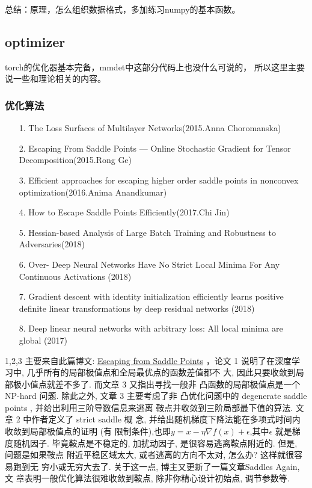 \documentclass[UTF8]{ctexart}
\begin{document}
总结：原理，怎么组织数据格式，多加练习numpy的基本函数。

\subsection{optimizer}
torch的优化器基本完备，mmdet中这部分代码上也没什么可说的，
所以这里主要说一些和理论相关的内容。

\subsubsection{优化算法}

\begin{itemize}
	\item[1.] The Loss Surfaces of Multilayer Networks(2015.Anna Choromanska) \label{all not diff}
	\item[2.]  Escaping From Saddle Points — Online Stochastic Gradient for Tensor
	Decomposition(2015.Rong Ge)
	\item[3.] Efficient approaches for escaping higher order saddle points in 
	nonconvex optimization(2016.Anima Anandkumar)
	\item[4.]  How to Escape Saddle Points Efficiently(2017.Chi Jin)
	\item[5.]  Hessian-based Analysis of Large Batch Training and Robustness to
	Adversaries(2018)
	\item[6.] Over- Deep Neural Networks Have No Strict Local Minima For Any
	Continuous Activations (2018)
	\item[7.] Gradient descent with identity initialization efficiently learns positive
	definite linear transformations by deep residual networks (2018)
	\item[8.] Deep linear neural networks with arbitrary loss: All local minima are
	global (2017)
	
\end{itemize}

1,2,3 主要来自此篇博文:
\href{http://www.offconvex.org/2016/03/22/saddlepoints/}{Escaping from Saddle Points}
，论文 1 说明了在深度学习中, 几乎所有的局部极值点和全局最优点的函数差值都不
大, 因此只要收敛到局部极小值点就差不多了. 而文章 3 又指出寻找一般非
凸函数的局部极值点是一个 NP-hard 问题. 除此之外, 文章 3 主要考虑了非
凸优化问题中的 degenerate saddle points , 并给出利用三阶导数信息来逃离
鞍点并收敛到三阶局部最下值的算法. 文章 2 中作者定义了 strict saddle 概
念, 并给出随机梯度下降法能在多项式时间内收敛到局部极值点的证明 (有
限制条件),也即$y=x-\eta \nabla f(x)+\epsilon$,其中$\epsilon$ 就是梯度随机因子.
毕竟鞍点是不稳定的, 加扰动因子, 是很容易逃离鞍点附近的. 但是, 问题是如果鞍点
附近平稳区域太大, 或者逃离的方向不太对, 怎么办? 这样就很容易跑到无
穷小或无穷大去了. 关于这一点, 博主又更新了一篇文章Saddles Again, 文
章表明一般优化算法很难收敛到鞍点, 除非你精心设计初始点, 调节参数等.
\end{document}
